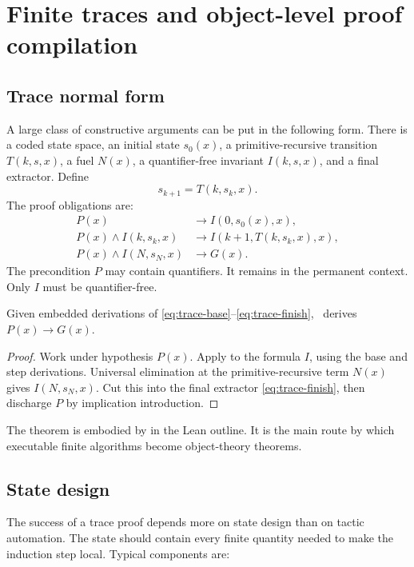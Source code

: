 \section{Finite traces and object-level proof compilation}

\subsection{Trace normal form}

A large class of constructive arguments can be put in the following form.  There is a coded state space, an initial state \(s_0(x)\), a primitive-recursive transition \(T(k,s,x)\), a fuel \(N(x)\), a quantifier-free invariant \(I(k,s,x)\), and a final extractor.  Define
\[
 s_{k+1}=T(k,s_k,x).
\]
The proof obligations are:
\begin{align}
 P(x)&\to I(0,s_0(x),x),\label{eq:trace-base}\\
 P(x)\wedge I(k,s_k,x)&\to I(k+1,T(k,s_k,x),x),\label{eq:trace-step}\\
 P(x)\wedge I(N,s_N,x)&\to G(x).\label{eq:trace-finish}
\end{align}
The precondition \(P\) may contain quantifiers.  It remains in the permanent context.  Only \(I\) must be quantifier-free.

\begin{theorem}\label{thm:trace-compilation}
Given embedded derivations of \eqref{eq:trace-base}--\eqref{eq:trace-finish}, \iPRA\ derives \(P(x)\to G(x)\).
\end{theorem}

\begin{proof}
Work under hypothesis \(P(x)\).  Apply  to the formula \(I\), using the base and step derivations.  Universal elimination at the primitive-recursive term \(N(x)\) gives \(I(N,s_N,x)\).  Cut this into the final extractor \eqref{eq:trace-finish}, then discharge \(P\) by implication introduction.
\end{proof}

The theorem is embodied by  in the Lean outline.  It is the main route by which executable finite algorithms become object-theory theorems.

\subsection{State design}

The success of a trace proof depends more on state design than on tactic automation.  The state should contain every finite quantity needed to make the induction step local.  Typical components are:


